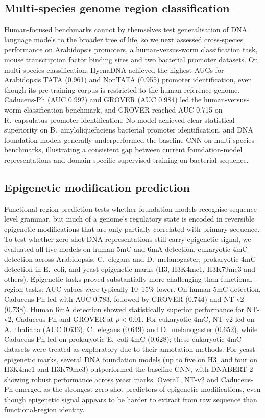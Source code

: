\documentclass[11pt,a4paper]{article}
\begin{document}
\subsection{Multi-species genome region classification}
Human-focused benchmarks cannot by themselves test generalisation of DNA language models to the broader tree of life, so we next assessed cross-species performance on Arabidopsis promoters, a human-versus-worm classification task, mouse transcription factor binding sites and two bacterial promoter datasets. On multi-species classification, HyenaDNA achieved the highest AUCs for Arabidopsis TATA (0.961) and NonTATA (0.955) promoter identification, even though its pre-training corpus is restricted to the human reference genome. Caduceus-Ph (AUC 0.992) and GROVER (AUC 0.984) led the human-versus-worm classification benchmark, and GROVER reached AUC 0.715 on R.~capsulatus promoter identification. No model achieved clear statistical superiority on B.~amyloliquefaciens bacterial promoter identification, and DNA foundation models generally underperformed the baseline CNN on multi-species benchmarks, illustrating a consistent gap between current foundation-model representations and domain-specific supervised training on bacterial sequence.

\subsection{Epigenetic modification prediction}
Functional-region prediction tests whether foundation models recognise sequence-level grammar, but much of a genome's regulatory state is encoded in reversible epigenetic modifications that are only partially correlated with primary sequence. To test whether zero-shot DNA representations still carry epigenetic signal, we evaluated all five models on human 5mC and 6mA detection, eukaryotic 4mC detection across Arabidopsis, C.~elegans and D.~melanogaster, prokaryotic 4mC detection in E.~coli, and yeast epigenetic marks (H3, H3K4me1, H3K79me3 and others). Epigenetic tasks proved substantially more challenging than functional-region tasks: AUC values were typically 10--15\% lower. On human 5mC detection, Caduceus-Ph led with AUC 0.783, followed by GROVER (0.744) and NT-v2 (0.738). Human 6mA detection showed statistically superior performance for NT-v2, Caduceus-Ph and GROVER at $p < 0.01$. For eukaryotic 4mC, NT-v2 led on A.~thaliana (AUC 0.633), C.~elegans (0.649) and D.~melanogaster (0.652), while Caduceus-Ph led on prokaryotic E.~coli 4mC (0.628); these eukaryotic 4mC datasets were treated as exploratory due to their annotation methods. For yeast epigenetic marks, several DNA foundation models (up to five on H3, and four on H3K4me1 and H3K79me3) outperformed the baseline CNN, with DNABERT-2 showing robust performance across yeast marks. Overall, NT-v2 and Caduceus-Ph emerged as the strongest zero-shot predictors of epigenetic modifications, even though epigenetic signal appears to be harder to extract from raw sequence than functional-region identity.
\end{document}
